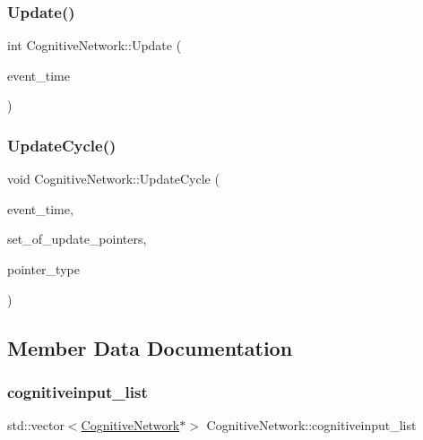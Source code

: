 \subsubsection{\texorpdfstring{Update()}{Update()}}
{\footnotesize\ttfamily int Cognitive\+Network\+::\+Update (\begin{DoxyParamCaption}\item[{std\+::chrono\+::time\+\_\+point$<$ \mbox{\hyperlink{universe_8h_a0ef8d951d1ca5ab3cfaf7ab4c7a6fd80}{Clock}} $>$}]{event\+\_\+time }\end{DoxyParamCaption})}

\mbox{\label{classCognitiveNetwork_aa37dda869174e4eef986cca4ce3e55d2}} 
\subsubsection{\texorpdfstring{Update\+Cycle()}{UpdateCycle()}}
{\footnotesize\ttfamily void Cognitive\+Network\+::\+Update\+Cycle (\begin{DoxyParamCaption}\item[{std\+::chrono\+::time\+\_\+point$<$ \mbox{\hyperlink{universe_8h_a0ef8d951d1ca5ab3cfaf7ab4c7a6fd80}{Clock}} $>$}]{event\+\_\+time,  }\item[{std\+::vector$<$ \mbox{\hyperlink{classCognitiveNetwork}{Cognitive\+Network}} $\ast$$>$}]{set\+\_\+of\+\_\+update\+\_\+pointers,  }\item[{unsigned int}]{pointer\+\_\+type }\end{DoxyParamCaption})}



\subsection{Member Data Documentation}
\mbox{\label{classCognitiveNetwork_a5a46cefb188858fdc023df3abbac0a47}} 
\subsubsection{\texorpdfstring{cognitiveinput\+\_\+list}{cognitiveinput\_list}}
{\footnotesize\ttfamily std\+::vector$<$\mbox{\hyperlink{classCognitiveNetwork}{Cognitive\+Network}}$\ast$$>$ Cognitive\+Network\+::cognitiveinput\+\_\+list\hspace{0.3cm}{\ttfamily [protected]}}

